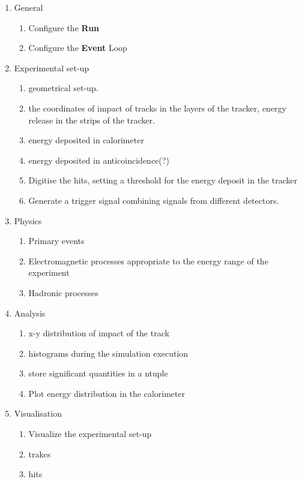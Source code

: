 \begin{enumerate}
    \item General
	\begin{enumerate}
	    \item Configure the \textbf{Run}
	    \item Configure the \textbf{Event} Loop
	\end{enumerate}
    \item Experimental set-up
	\begin{enumerate}
	    \item geometrical set-up.
	    \item the coordinates of impact of tracks in the layers of the
		tracker, energy release in the strips of the tracker.
	    \item energy deposited in calorimeter
	    \item energy deposited in anticoincidence(?)
	    \item Digitise the hits, setting a threshold for the energy
		deposit in the tracker
	    \item Generate a trigger signal combining signals from different
		detectors.
	\end{enumerate}
    \item Physics
	\begin{enumerate}
	    \item Primary events
	    \item Electromagnetic processes appropriate to the energy range
		of the experiment
	    \item Hadronic processes
	\end{enumerate}
    \item Analysis
	\begin{enumerate}
	    \item x-y distribution of impact of the track
	    \item histograms during the simulation execution
	    \item store significant quantities in a ntuple
	    \item Plot energy distribution in the calorimeter
	\end{enumerate}
    \item Visualisation
	\begin{enumerate}
	    \item Visualize the experimental set-up
	    \item trakcs
	    \item hits
	\end{enumerate}

\end{enumerate}
